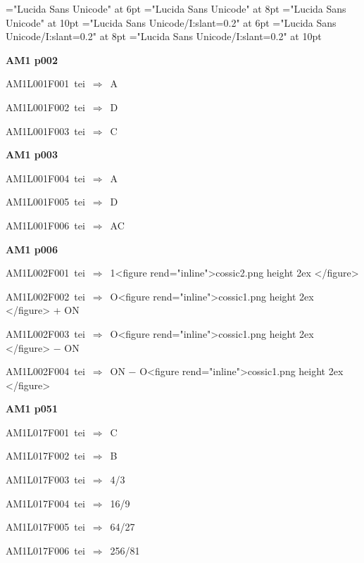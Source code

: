 
\font\sixrm="Lucida Sans Unicode" at 6pt
\font\eightrm="Lucida Sans Unicode" at 8pt
\font\tenrm="Lucida Sans Unicode" at 10pt
\font\sixit="Lucida Sans Unicode/I:slant=0.2" at 6pt
\font\eightit="Lucida Sans Unicode/I:slant=0.2" at 8pt
\font\tenit="Lucida Sans Unicode/I:slant=0.2" at 10pt
\tenrm

\par\vfill\eject
{\bf\hfill AM1 p002\hfill\hbox{}}\par\bigskip
{\sixrm AM1L001F001\ {\sixit tei}\ }$\Rightarrow$\ A\par\smallskip
{\sixrm AM1L001F002\ {\sixit tei}\ }$\Rightarrow$\ D\par\smallskip
{\sixrm AM1L001F003\ {\sixit tei}\ }$\Rightarrow$\ C\par\smallskip

\par\vfill\eject
{\bf\hfill AM1 p003\hfill\hbox{}}\par\bigskip
{\sixrm AM1L001F004\ {\sixit tei}\ }$\Rightarrow$\ A\par\smallskip
{\sixrm AM1L001F005\ {\sixit tei}\ }$\Rightarrow$\ D\par\smallskip
{\sixrm AM1L001F006\ {\sixit tei}\ }$\Rightarrow$\ AC\par\smallskip

\par\vfill\eject
{\bf\hfill AM1 p006\hfill\hbox{}}\par\bigskip
{\sixrm AM1L002F001\ {\sixit tei}\ }$\Rightarrow$\ 1<figure rend="inline">\XeTeXpicfile cossic2.png height 2ex </figure>\par\smallskip
{\sixrm AM1L002F002\ {\sixit tei}\ }$\Rightarrow$\ O<figure rend="inline">\XeTeXpicfile cossic1.png height 2ex </figure> + ON\par\smallskip
{\sixrm AM1L002F003\ {\sixit tei}\ }$\Rightarrow$\ O<figure rend="inline">\XeTeXpicfile cossic1.png height 2ex </figure> − ON\par\smallskip
{\sixrm AM1L002F004\ {\sixit tei}\ }$\Rightarrow$\ ON − O<figure rend="inline">\XeTeXpicfile cossic1.png height 2ex </figure>\par\smallskip

\par\vfill\eject
{\bf\hfill AM1 p051\hfill\hbox{}}\par\bigskip
{\sixrm AM1L017F001\ {\sixit tei}\ }$\Rightarrow$\ C\par\smallskip
{\sixrm AM1L017F002\ {\sixit tei}\ }$\Rightarrow$\ B\par\smallskip
{\sixrm AM1L017F003\ {\sixit tei}\ }$\Rightarrow$\ 4/3\par\smallskip
{\sixrm AM1L017F004\ {\sixit tei}\ }$\Rightarrow$\ 16/9\par\smallskip
{\sixrm AM1L017F005\ {\sixit tei}\ }$\Rightarrow$\ 64/27\par\smallskip
{\sixrm AM1L017F006\ {\sixit tei}\ }$\Rightarrow$\ 256/81\par\smallskip

